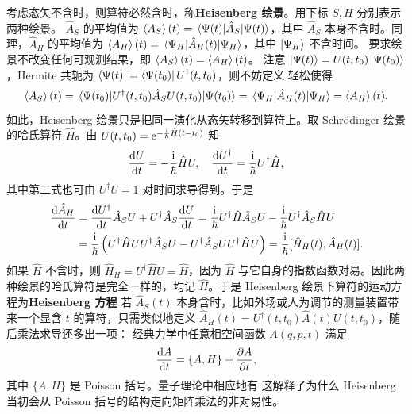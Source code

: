 
考虑态矢不含时，则算符必然含时，称\textbf{Heisenberg 绘景}。用下标 $S,H$ 分别表示两种绘景。
$\hat A_S$ 的平均值为 $\ev{A_S}(t)=\mel{\Psi(t)}{\hat A_S}{\Psi(t)}$，其中 $\hat A_S$ 本身不含时。同理，$\hat A_H$ 的平均值为 $\ev{A_H}(t)=\mel{\Psi_H}{\hat A_H(t)}{\Psi_H}$，其中 $\ket{\Psi_H}$ 不含时间。
要求绘景不改变任何可观测结果，即 $\ev{A_S}(t)=\ev{A_H}(t)$。
注意 $\ket{\Psi(t)}=U(t,t_0)\ket{\Psi(t_0)}$，Hermite 共轭为 $\bra{\Psi(t)}=\bra{\Psi(t_0)}U^\dagger(t,t_0)$，则不妨定义
轻松使得
\[
    \ev{A_S}(t)
    =
    \mel{\Psi(t_0)}{U^\dagger(t,t_0)\hat A_S U(t,t_0)}{\Psi(t_0)}
    =
    \mel{\Psi_H}{\hat A_H(t)}{\Psi_H}
    =\ev{A_H}(t).
\]
如此，Heisenberg 绘景只是把同一演化从态矢转移到算符上。取 Schr\"odinger 绘景的哈氏算符 $\hat H$。由 $U(t,t_0)=\mathrm{e}^{-\frac{\mathrm{i}}{\hbar}\hat H(t-t_0)}$
知
\[
    \dv{U}{t}=-\frac{\mathrm{i}}{\hbar}\hat H U,\quad
    \dv{U^\dagger}{t}=\frac{\mathrm{i}}{\hbar}U^\dagger\hat H,
\]
其中第二式也可由 $U^\dagger U=1$ 对时间求导得到。于是
\begin{align*}
    \dv{\hat A_H}{t}
    &=
    \dv{U^\dagger}{t}\hat A_S U
    +U^\dagger\hat A_S\dv{U}{t}=
    \frac{\mathrm{i}}{\hbar}U^\dagger\hat H\hat A_S U
    -\frac{\mathrm{i}}{\hbar}U^\dagger\hat A_S\hat H U\\
    &=
    \frac{\mathrm{i}}{\hbar}
    \left(
        U^\dagger\hat H U U^\dagger\hat A_S U
        -
        U^\dagger\hat A_S U U^\dagger\hat H U
    \right)=
    \frac{\mathrm{i}}{\hbar}[\hat H_H(t),\hat A_H(t)].
\end{align*}
如果 $\hat H$ 不含时，则 $\hat H_H=U^\dagger \hat H U=\hat H$，因为 $\hat H$ 与它自身的指数函数对易。因此两种绘景的哈氏算符是完全一样的，均记 $\hat H$。于是 Heisenberg 绘景下算符的运动方程为\textbf{Heisenberg 方程}
若 $\hat A_S(t)$ 本身含时，比如外场或人为调节的测量装置带来一个显含 $t$ 的算符，只需类似地定义 $\hat A_H(t)=U^\dagger(t,t_0)\hat A(t)U(t,t_0)$，随后乘法求导还多出一项：
经典力学中任意相空间函数 $A(q,p,t)$ 满足
\[
    \dv{A}{t}=\{A,H\}+\pdv{A}{t},
\]
其中 $\{A,H\}$ 是 Poisson 括号。量子理论中相应地有
这解释了为什么 Heisenberg 当初会从 Poisson 括号的结构走向矩阵乘法的非对易性。
